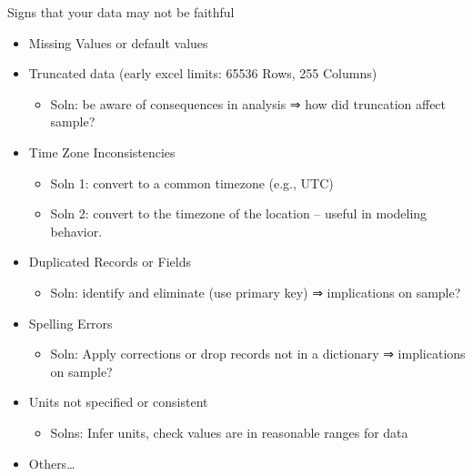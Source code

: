 \documentclass[aspectratio=169]{../latex_main/tntbeamer}  %
\begin{document}
	\begin{frame}{Signs that your data may not be faithful}
	    \begin{itemize}
	        \item Missing Values or default values
	        \item Truncated data (early excel limits: 65536 Rows, 255 Columns)
	        \begin{itemize}
	            \item Soln: be aware of consequences in analysis ⇒ how did truncation affect sample?
	        \end{itemize}
	        \item Time Zone Inconsistencies
            \begin{itemize}
                \item Soln 1: convert to a common timezone (e.g., UTC) 
                \item Soln 2: convert to the timezone of the location – useful in modeling behavior.
            \end{itemize}
            \item Duplicated Records or Fields
            \begin{itemize}
                \item Soln: identify and eliminate (use primary key) ⇒ implications on sample?
            \end{itemize}
            \item Spelling Errors
            \begin{itemize}
                \item Soln: Apply corrections or drop records not in a dictionary ⇒ implications on sample?
            \end{itemize}
            \item Units not specified or consistent
            \begin{itemize}
                \item Solns: Infer units, check values are in reasonable ranges for data
            \end{itemize}
            \item Others…
	    \end{itemize}
	\end{frame}
\end{document}
